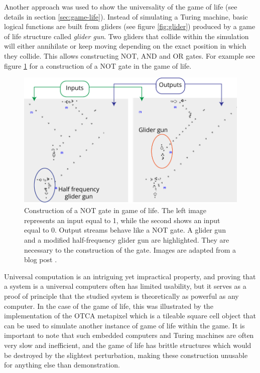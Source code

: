 Another approach was used to show the universality of the game of life (see
details in section \ref{sec:game-life}). Instead of simulating a Turing machine,
basic logical functions are built from gliders (see figure \ref{fig:glider})
produced by a game of life structure called \emph{glider gun}. Two gliders that
collide within the simulation will either annihilate or keep moving depending on
the exact position in which they collide. This allows constructing NOT, AND and
OR gates. For example see figure \ref{fig:gol_not_gate} for a construction of a
NOT gate in the game of life.

\begin{figure}[htbp]
  \centering
  \includegraphics[width=.8\linewidth]{figures/gol_not_gate}
  \caption{Construction of a NOT gate in game of life. The left image represents
    an input equal to 1, while the second shows an input equal to 0. Output
    streams behave like a NOT gate. A glider gun and a modified half-frequency
    glider gun are highlighted. They are necessary to the construction of the
    gate. Images are adapted from a blog post
    \parencite{carliniDigitalLogicGates2020}.}
  \label{fig:gol_not_gate}
\end{figure}

Universal computation is an intriguing yet impractical property, and proving
that a system is a universal computers often has limited usability, but it
serves as a proof of principle that the studied system is theoretically as
powerful as any computer. In the case of the game of life, this was illustrated
by the implementation of the OTCA metapixel which is a tileable square cell
object that can be used to simulate another instance of game of life within the
game. It is important to note that such embedded computers and Turing machines
are often very slow and inefficient, and the game of life has brittle structures
which would be destroyed by the slightest perturbation, making these
construction unusable for anything else than demonstration.

